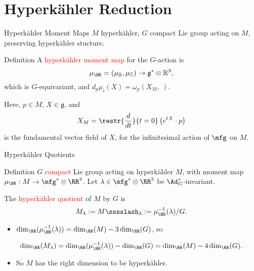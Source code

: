 \section{Hyperk\"ahler Reduction}

\begin{frame}{Hyperk\"ahler Moment Maps}
    $M$ hyperk\"ahler, $G$ compact Lie group acting on $M$, preserving hyperk\"ahler stucture.
    \begin{block}{Definition}
        A \textcolor{red}{hyperk\"ahler moment map} for the $G$-action is
        \[
            \mu_{\HK} = (\mu_{\mathbb{R}}, \mu_{\mathbb{C}}) \rightarrow \mathfrak{g}^{\ast}\otimes \mathbb{R}^{3},    
        \]
        which is $G$-equivariant, and $d_{p}\mu_{i}(X) = \omega_{p}(X_{M},\ )$.
    \end{block}
    Here, $p \in M$, $X \in \mathfrak{g}$, and 
    \[
        X_{M} = \restr{\frac{d}{dt}}{t=0}\left(e^{tX}\cdot p\right)
    \]
    is the fundamental vector field of $X$, for the infinitesimal action of $\mfg$ on $M$.
\end{frame}

\begin{frame}{Hyperk\"ahler Quotients}
    \begin{block}{Definition}
        $G$ \textcolor{red}{compact} Lie group acting on hyperk\"ahler $M$, with moment map $\mu_{\HK} : M \rightarrow \mfg^{\ast}\otimes \RR^{3}$. Let $\lambda \in \mfg^{\ast} \otimes \RR^{3}$ be $\Ad_{G}^{\ast}$-invariant.
        
        The \textcolor{red}{hyperk\"ahler quotient} of $M$ by $G$ is
        \[
            M_{\lambda} := M \sssslash_{\lambda} := \mu_{\HK}^{-1}(\lambda)/G.    
        \]
    \end{block}
    \begin{itemize}
        \item $\dim_{\RR}(\mu_{\HK}^{-1}(\lambda)) = \dim_{\RR}(M) - 3\dim_{\RR}(G)$, so
    \end{itemize}
    \[
            \dim_{\RR}(M_{\lambda}) = \dim_{\RR}(\mu_{\HK}^{-1}(\lambda)) - \dim_{\RR}(G) = \dim_{\RR}(M) - 4\dim_{\RR}(G).    
    \]
    \begin{itemize}
        \item So $M$ has the right dimension to be hyperk\"ahler.
    \end{itemize}
\end{frame}

